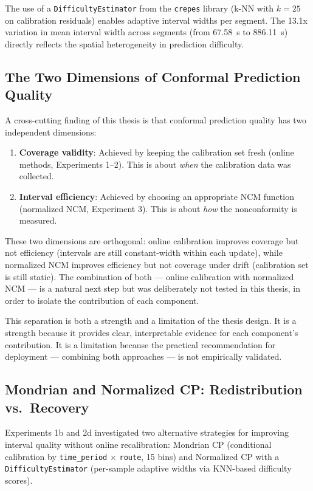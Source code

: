 The use of a \texttt{DifficultyEstimator} from the \texttt{crepes} library (k-NN with $k=25$ on calibration residuals) enables adaptive interval widths per segment. The 13.1x variation in mean interval width across segments (from 67.58~s to 886.11~s) directly reflects the spatial heterogeneity in prediction difficulty.

\subsection{The Two Dimensions of Conformal Prediction Quality}

A cross-cutting finding of this thesis is that conformal prediction quality has two independent dimensions:

\begin{enumerate}
    \item \textbf{Coverage validity}: Achieved by keeping the calibration set fresh (online methods, Experiments 1--2). This is about \emph{when} the calibration data was collected.
    \item \textbf{Interval efficiency}: Achieved by choosing an appropriate NCM function (normalized NCM, Experiment 3). This is about \emph{how} the nonconformity is measured.
\end{enumerate}

These two dimensions are orthogonal: online calibration improves coverage but not efficiency (intervals are still constant-width within each update), while normalized NCM improves efficiency but not coverage under drift (calibration set is still static). The combination of both — online calibration with normalized NCM — is a natural next step but was deliberately not tested in this thesis, in order to isolate the contribution of each component.

This separation is both a strength and a limitation of the thesis design. It is a strength because it provides clear, interpretable evidence for each component's contribution. It is a limitation because the practical recommendation for deployment — combining both approaches — is not empirically validated.

\subsection{Mondrian and Normalized CP: Redistribution vs.\ Recovery}

Experiments 1b and 2d investigated two alternative strategies for improving interval quality without online recalibration: Mondrian CP (conditional calibration by \texttt{time\_period} $\times$ \texttt{route}, 15 bins) and Normalized CP with a \texttt{DifficultyEstimator} (per-sample adaptive widths via KNN-based difficulty scores).


